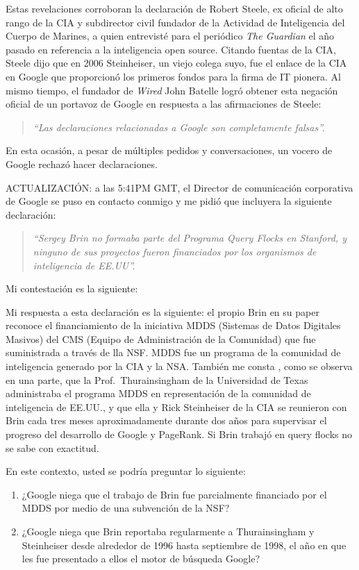 \documentclass[10pt,a5paper,twoside,spanish,]{book}
\begin{document}
Estas revelaciones corroboran la declaración de Robert Steele, ex
oficial de alto rango de la CIA y subdirector civil fundador de la
Actividad de Inteligencia del Cuerpo de Marines, a quien entrevisté para
el periódico \emph{The Guardian} el año pasado en referencia a la
inteligencia open source. Citando fuentas de la CIA, Steele dijo que en
2006 Steinheiser, un viejo colega suyo, fue el enlace de la CIA en
Google que proporcionó los primeros fondos para la firma de IT pionera.
Al mismo tiempo, el fundador de \emph{Wired} John Batelle logró obtener
esta negación oficial de un portavoz de Google en respuesta a las
afirmaciones de Steele:

\begin{quote}
\emph{``Las declaraciones relacionadas a Google son completamente
falsas''.}
\end{quote}

En esta ocasión, a pesar de múltiples pedidos y conversaciones, un
vocero de Google rechazó hacer declaraciones.

ACTUALIZACIÓN: a las 5:41PM GMT, el Director de comunicación corporativa
de Google se puso en contacto conmigo y me pidió que incluyera la
siguiente declaración:

\begin{quote}
\emph{``Sergey Brin no formaba parte del Programa Query Flocks en
Stanford, y ninguno de sus proyectos fueron financiados por los
organismos de inteligencia de EE.UU''.}
\end{quote}

Mi contestación es la siguiente:

Mi respuesta a esta declaración es la siguiente: el propio Brin en su
paper reconoce el financiamiento de la iniciativa MDDS (Sistemas de
Datos Digitales Masivos) del CMS (Equipo de Administración de la
Comunidad) que fue suministrada a través de lla NSF. MDDS fue un
programa de la comunidad de inteligencia generado por la CIA y la NSA.
También me consta , como se observa en una parte, que la
Prof.~Thurainsingham de la Universidad de Texas administraba el programa
MDDS en representación de la comunidad de inteligencia de EE.UU., y que
ella y Rick Steinheiser de la CIA se reunieron con Brin cada tres meses
aproximadamente durante dos años para supervisar el progreso del
desarrollo de Google y PageRank. Si Brin trabajó en query flocks no se
sabe con exactitud.

En este contexto, usted se podría preguntar lo siguiente:

\begin{enumerate}
\def\labelenumi{\arabic{enumi})}
\item
  ¿Google niega que el trabajo de Brin fue parcialmente financiado por
  el MDDS por medio de una subvención de la NSF?
\item
  ¿Google niega que Brin reportaba regularmente a Thurainsingham y
  Steinheiser desde alrededor de 1996 hasta septiembre de 1998, el año
  en que les fue presentado a ellos el motor de búsqueda Google?
\end{enumerate}
\end{document}
